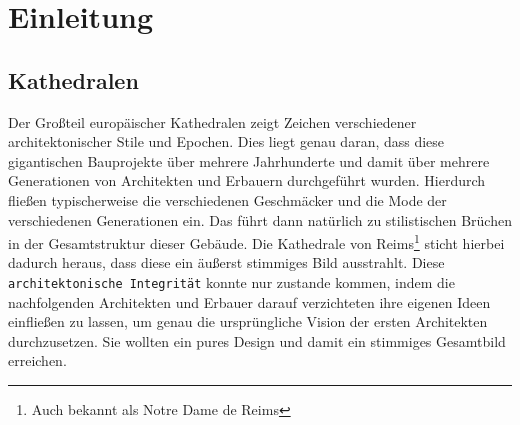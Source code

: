 \documentclass[a4paper, ngerman, 12pt, usenames, dvipsnames]{article}
\begin{document}
\tableofcontents
\thispagestyle{empty}
\pagebreak

\section{Einleitung}
\subsection{Kathedralen}
Der Großteil europäischer Kathedralen zeigt Zeichen verschiedener architektonischer Stile und Epochen.
Dies liegt genau daran, dass diese gigantischen Bauprojekte über mehrere Jahrhunderte und damit über mehrere Generationen von Architekten und Erbauern durchgeführt wurden.
Hierdurch fließen typischerweise die verschiedenen Geschmäcker und die Mode der verschiedenen Generationen ein.
Das führt dann natürlich zu stilistischen Brüchen in der Gesamtstruktur dieser Gebäude.
Die Kathedrale von Reims\footnote{Auch bekannt als Notre Dame de Reims} sticht hierbei dadurch heraus, dass diese ein äußerst stimmiges Bild ausstrahlt.
Diese \texttt{architektonische Integrität} konnte nur zustande kommen, indem die nachfolgenden Architekten und Erbauer darauf verzichteten ihre eigenen Ideen einfließen zu lassen, um genau die ursprüngliche Vision der ersten Architekten durchzusetzen. Sie wollten ein pures Design und damit ein stimmiges Gesamtbild erreichen. \cite{Brooks1975}
\end{document}

